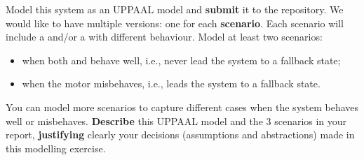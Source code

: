 \documentclass[11pt]{article}
\begin{document}
\begin{myExercise} \label{ex:model}
  Model this system as an UPPAAL model and \textbf{submit} it to the repository.
  We would like to have multiple versions: one for each \textbf{scenario}.
  Each scenario will include a  and/or a  with different behaviour. 
  Model at least two scenarios:
  \begin{itemize}
    \item when both  and  behave well, i.e., never lead the system to a fallback state;
    \item when the motor misbehaves, i.e., leads the system to a fallback state.
  \end{itemize}
  You can model more scenarios to capture different cases when the system behaves well or misbehaves. \textbf{Describe} this UPPAAL model and the 3 scenarios in your report,
\textbf{justifying} clearly your decisions (assumptions and abstractions) made in this modelling exercise.







\end{myExercise}
\end{document}
